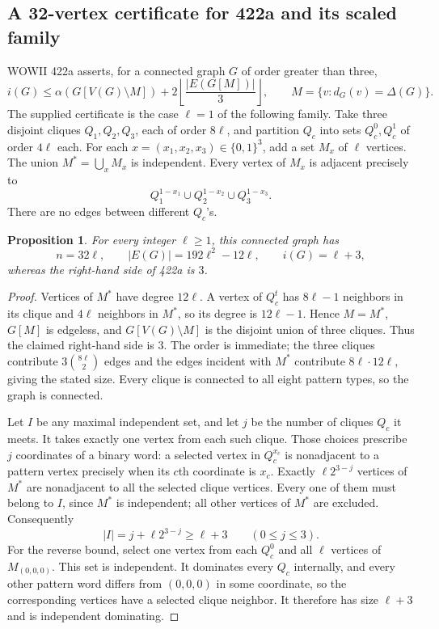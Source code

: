 \documentclass[11pt,a4paper]{article}
\newtheorem{proposition}[theorem]{Proposition}
\theoremstyle{remark}
\begin{document}
\subsection{A 32-vertex certificate for 422a and its scaled family}
\label{r7id:422a}

WOWII 422a asserts, for a connected graph $G$ of order greater than three,
\[
 i(G)\leq\alpha(G[V(G)\setminus M])
       +2\left\lfloor\frac{|E(G[M])|}{3}\right\rfloor,
 \qquad M=\{v:d_G(v)=\Delta(G)\}.
\]
The supplied certificate is the case $\ell=1$ of the following family.
Take three disjoint cliques $Q_1,Q_2,Q_3$, each of order $8\ell$, and
partition $Q_c$ into sets $Q_c^0,Q_c^1$ of order $4\ell$ each.
For each $x=(x_1,x_2,x_3)\in\{0,1\}^3$, add a set $M_x$ of $\ell$
vertices.  The union $M^*=\bigcup_xM_x$ is independent.  Every vertex of
$M_x$ is adjacent precisely to
\[
 Q_1^{1-x_1}\cup Q_2^{1-x_2}\cup Q_3^{1-x_3}.
\]
There are no edges between different $Q_c$'s.

\begin{proposition}\label{r7id:422a-values}
For every integer $\ell\geq1$, this connected graph has
\[
 n=32\ell,\qquad
 |E(G)|=192\ell^2-12\ell,\qquad
 i(G)=\ell+3,
\]
whereas the right-hand side of 422a is $3$.
\end{proposition}
\begin{proof}
Vertices of $M^*$ have degree $12\ell$.  A vertex of $Q_c^t$ has
$8\ell-1$ neighbors in its clique and $4\ell$ neighbors in $M^*$,
so its degree is $12\ell-1$.  Hence $M=M^*$, $G[M]$ is edgeless, and
$G[V(G)\setminus M]$ is the disjoint union of three cliques.
Thus the claimed right-hand side is $3$.
The order is immediate; the three cliques contribute
$3\binom{8\ell}{2}$ edges and the edges incident with $M^*$ contribute
$8\ell\cdot12\ell$, giving the stated size.
Every clique is connected to all eight pattern types, so the graph is
connected.

Let $I$ be any maximal independent set, and let $j$ be the number of
cliques $Q_c$ it meets.  It takes exactly one vertex from each such
clique.  Those choices prescribe $j$ coordinates of a binary word:
a selected vertex in $Q_c^{x_c}$ is nonadjacent to a pattern vertex
precisely when its $c$th coordinate is $x_c$.
Exactly $\ell2^{3-j}$ vertices of $M^*$ are nonadjacent to all the
selected clique vertices.  Every one of them must belong to $I$, since
$M^*$ is independent; all other vertices of $M^*$ are excluded.
Consequently
\[
 |I|=j+\ell2^{3-j}\geq\ell+3
 \qquad(0\leq j\leq3).
\]
For the reverse bound, select one vertex from each $Q_c^0$ and all
$\ell$ vertices of $M_{(0,0,0)}$.
This set is independent.  It dominates every $Q_c$ internally, and every
other pattern word differs from $(0,0,0)$ in some coordinate, so the
corresponding vertices have a selected clique neighbor.
It therefore has size $\ell+3$ and is independent dominating.
\end{proof}
\end{document}
